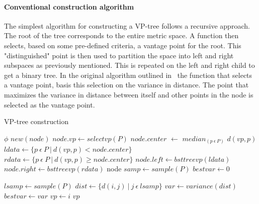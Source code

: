 \documentclass[11pt]{article}
\begin{document}
\paragraph{Conventional construction algorithm} The simplest algorithm for constructing a VP-tree follows a recursive approach. The root of the tree corresponds to the entire metric space. A function then selects, based on some pre-defined criteria, a vantage point for the root. This "distinguished" point is then used to partition the space into left and right subspaces as previously mentioned. This is repeated on the left and right child to get a binary tree. In the original algorithm outlined in~\cite{Yianilos93} the function that selects a vantage point, basis this selection on the variance in distance. The point that maximizes the variance in distance between itself and other points in the node is selected as the vantage point. 
\begin{algorithm}[h]
\caption{VP-tree construction~\cite{Yianilos93}}
\label{alg:vp-treecon}
\begin{algorithmic}[1]
 \Return $\phi$
\EndIf
\State $new(node)$
\State $node.vp \gets selectvp(P)$
\State $node.center$ $\gets$ $median_{(p\ \epsilon\ P)}$ $d(vp, p)$
\State $ldata \gets \{p\ \epsilon\ P\ |\ d(vp, p) < node.center\}$
\State $rdata \gets \{p\ \epsilon\ P\ |\ d(vp, p) \geq node.center\}$
\State $node.left \gets bsttreevp(ldata)$
\State $node.right \gets bsttreevp(rdata)$
\State \Return node
\EndProcedure
{}
\State $samp \gets sample(P)$
\State $bestvar \gets 0$
\end{algorithmic}
\end{algorithm}

\begin{algorithm}[h]
\begin{algorithmic}[1]
\State $lsamp \gets sample(P)$
\State $dist \gets \{d(i, j)\ |\ j\ \epsilon\ lsamp\}$
\State $var \gets variance(dist)$
\State $bestvar \gets var$
\State $vp \gets i$
\EndIf
\EndFor
\State \Return $vp$
\EndProcedure
\end{algorithmic}
\end{algorithm}
\end{document}
